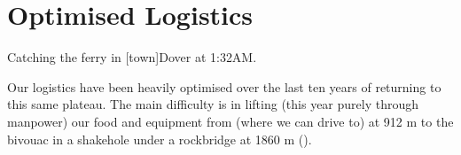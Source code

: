 \section{Optimised Logistics}

\begin{marginfigure}
\checkoddpage \ifoddpage \forcerectofloat \else \forceversofloat \fi
\centering
 \caption{Catching the ferry in [town]Dover at 1:32AM. }
 \label{ferry 2009}
\end{marginfigure}

Our logistics have been heavily optimised over the last ten years of
returning to this same plateau. The main difficulty is in lifting (this
year purely through manpower) our food and equipment from  (where we can drive to) at 912 m to the bivouac in a shakehole
under a rockbridge at 1860 m ().

